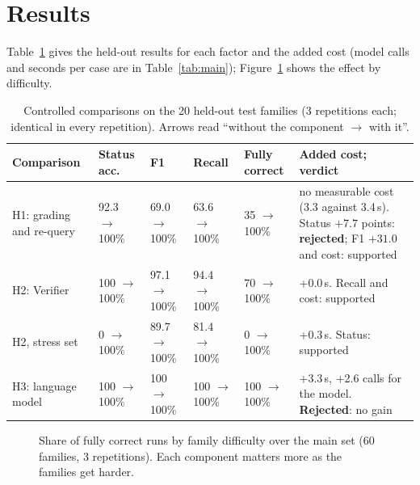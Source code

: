 \section{Results}
Table~\ref{tab:exp} gives the held-out results for each factor and the added cost (model calls and seconds per case are in Table~\ref{tab:main}); Figure~\ref{fig:diff} shows the effect by difficulty.

\begin{table}[H]
\centering\footnotesize{}
\caption[Controlled comparisons on the held-out families]{Controlled comparisons on the 20 held-out test families (3 repetitions each; identical in every repetition). Arrows read ``without the component $\to$ with it''.}\label{tab:exp}
\renewcommand{\arraystretch}{1.15}
\begin{tabular}{@{}p{2.5cm}p{1.8cm}p{1.8cm}p{1.8cm}p{1.6cm}p{3.6cm}@{}}
\toprule
\textbf{Comparison} & \textbf{Status acc.} & \textbf{F1} & \textbf{Recall} & \textbf{Fully correct} & \textbf{Added cost; verdict} \\ \midrule
H1: grading and re-query & 92.3 $\to$ 100\% & 69.0 $\to$ 100\% & 63.6 $\to$ 100\% & 35 $\to$ 100\% & no measurable cost (3.3 against 3.4\,s). Status $+7.7$ points: \textbf{rejected}; F1 $+31.0$ and cost: supported \\
H2: Verifier & 100 $\to$ 100\% & 97.1 $\to$ 100\% & 94.4 $\to$ 100\% & 70 $\to$ 100\% & +0.0\,s. Recall and cost: supported \\
H2, stress set & 0 $\to$ 100\% & 89.7 $\to$ 100\% & 81.4 $\to$ 100\% & 0 $\to$ 100\% & +0.3\,s. Status: supported \\
H3: language model & 100 $\to$ 100\% & 100 $\to$ 100\% & 100 $\to$ 100\% & 100 $\to$ 100\% & +3.3\,s, +2.6 calls for the model. \textbf{Rejected}: no gain \\ \bottomrule
\end{tabular}
\end{table}

\begin{figure}[t]
\centering
{}
\caption[Fully correct runs by difficulty]{Share of fully correct runs by family difficulty over the main set (60 families, 3 repetitions). Each component matters more as the families get harder.}
\label{fig:diff}
\end{figure}

